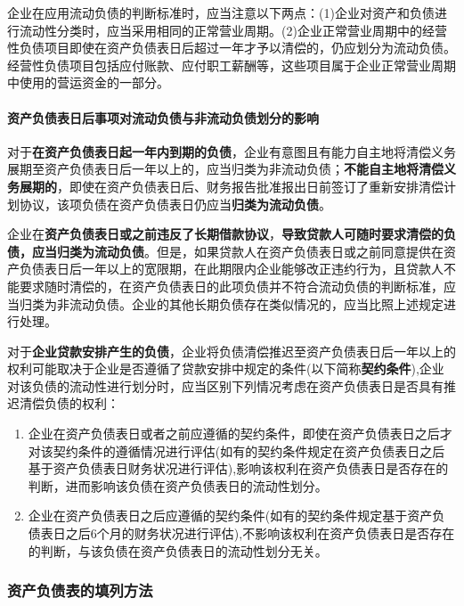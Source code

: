 \documentclass[UTF8,12pt]{ctexart}
\numberwithin{equation}{section} %
\numberwithin{figure}{section}
\numberwithin{table}{section}
\begin{document}
	企业在应用流动负债的判断标准时，应当注意以下两点：(1)企业对资产和负债进行流动性分类时，应当采用相同的正常营业周期。(2)企业正常营业周期中的经营性负债项目即使在资产负债表日后超过一年才予以清偿的，仍应划分为流动负债。经营性负债项目包括应付账款、应付职工薪酬等，这些项目属于企业正常营业周期中使用的营运资金的一部分。
	
	\paragraph{资产负债表日后事项对流动负债与非流动负债划分的影响}
	
	对于\textbf{在资产负债表日起一年内到期的负债}，企业有意图且有能力自主地将清偿义务展期至资产负债表日后一年以上的，应当归类为非流动负债；\textbf{不能自主地将清偿义务展期的}，即使在资产负债表日后、财务报告批准报出日前签订了重新安排清偿计划协议，该项负债在资产负债表日仍应当\textbf{归类为流动负债}。
	
	企业在\textbf{资产负债表日或之前违反了长期借款协议}，\textbf{导致贷款人可随时要求清偿的负债，应当归类为流动负债}。但是，如果贷款人在资产负债表日或之前同意提供在资产负债表日后一年以上的宽限期，在此期限内企业能够改正违约行为，且贷款人不能要求随时清偿的，在资产负债表日的此项负债并不符合流动负债的判断标准，应当归类为非流动负债。企业的其他长期负债存在类似情况的，应当比照上述规定进行处理。
	
	对于\textbf{企业贷款安排产生的负债}，企业将负债清偿推迟至资产负债表日后一年以上的权利可能取决于企业是否遵循了贷款安排中规定的条件(以下简称\textbf{契约条件}),企业对该负债的流动性进行划分时，应当区别下列情况考虑在资产负债表日是否具有推迟清偿负债的权利：
	\begin{enumerate}
		\item 企业在资产负债表日或者之前应遵循的契约条件，即使在资产负债表日之后才对该契约条件的遵循情况进行评估(如有的契约条件规定在资产负债表日之后基于资产负债表日财务状况进行评估),影响该权利在资产负债表日是否存在的判断，进而影响该负债在资产负债表日的流动性划分。
		
		\item 企业在资产负债表日之后应遵循的契约条件(如有的契约条件规定基于资产负债表日之后6个月的财务状况进行评估),不影响该权利在资产负债表日是否存在的判断，与该负债在资产负债表日的流动性划分无关。
	\end{enumerate}
	
	\subsubsection{资产负债表的填列方法}
\end{document}

